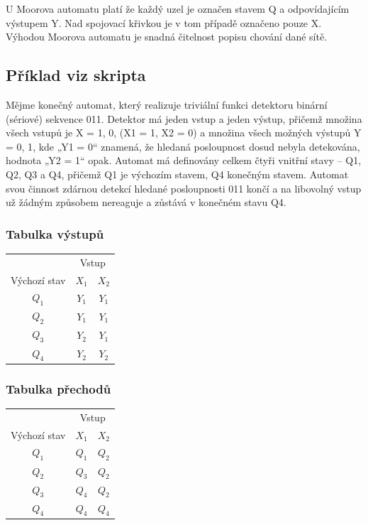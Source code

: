 U Moorova automatu platí že každý uzel je označen stavem Q a odpovídajícím výstupem Y.
Nad spojovací křivkou je v tom případě označeno pouze X.
Výhodou Moorova automatu je snadná čitelnost popisu chování dané sítě.


\subsection{Příklad viz skripta}

Mějme konečný automat, který realizuje triviální funkci detektoru binární (sériové)
sekvence 011.
Detektor má jeden vstup a jeden výstup, přičemž množina všech vstupů je X = {1, 0}, (X1 = 1, X2 = 0) a množina všech možných výstupů Y = {0, 1}, kde „Y1 = 0“ znamená, že hledaná posloupnost dosud nebyla detekována, hodnota „Y2 = 1“ opak.
Automat má definovány celkem čtyři vnitřní stavy – Q1, Q2, Q3 a Q4, přičemž Q1 je výchozím stavem, Q4 konečným stavem.
Automat svou činnost zdárnou detekcí hledané posloupnosti 011 končí a na libovolný vstup už žádným způsobem nereaguje a zůstává v konečném stavu Q4.

\subsubsection{Tabulka výstupů}

\begin{table}[ht]
    \begin{tabular}{ccc}
    \hline
                 & \multicolumn{2}{c}{Vstup} \\
    Výchozí stav & $X_1$       & $X_2$       \\\hline
    $Q_1$        & $Y_1$       & $Y_1$       \\
    $Q_2$        & $Y_1$       & $Y_1$       \\
    $Q_3$        & $Y_2$       & $Y_1$       \\
    $Q_4$        & $Y_2$       & $Y_2$       \\\hline
    \end{tabular}
\end{table}

\subsubsection{Tabulka přechodů}

\begin{table}[ht]
    \begin{tabular}{ccc}
    \hline
                 & \multicolumn{2}{c}{Vstup} \\
    Výchozí stav & $X_1$       & $X_2$       \\\hline
    $Q_1$        & $Q_1$       & $Q_2$       \\
    $Q_2$        & $Q_3$       & $Q_2$       \\
    $Q_3$        & $Q_4$       & $Q_2$       \\
    $Q_4$        & $Q_4$       & $Q_4$       \\\hline
    \end{tabular}
\end{table}

